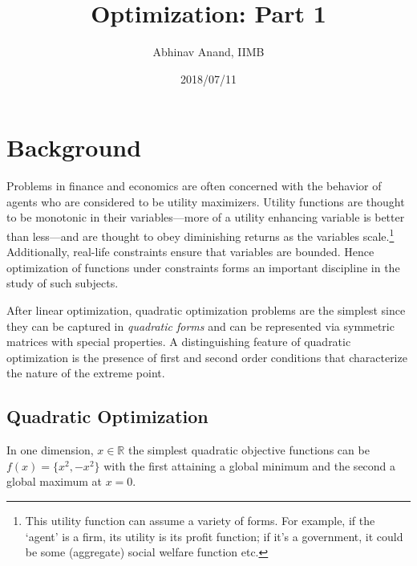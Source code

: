 \documentclass[11pt,]{article}
\title{Optimization: Part 1}
\author{Abhinav Anand, IIMB}
\date{2018/07/11}
\let\rmarkdownfootnote\footnote%
\def\footnote{\protect\rmarkdownfootnote}
\begin{document}
\maketitle

\section{Background}\label{background}

Problems in finance and economics are often concerned with the behavior
of agents who are considered to be utility maximizers. Utility functions
are thought to be monotonic in their variables---more of a utility
enhancing variable is better than less---and are thought to obey
diminishing returns as the variables scale.\footnote{This utility
  function can assume a variety of forms. For example, if the `agent' is
  a firm, its utility is its profit function; if it's a government, it
  could be some (aggregate) social welfare function etc.} Additionally,
real-life constraints ensure that variables are bounded. Hence
optimization of functions under constraints forms an important
discipline in the study of such subjects.

After linear optimization, quadratic optimization problems are the
simplest since they can be captured in \emph{quadratic forms} and can be
represented via symmetric matrices with special properties. A
distinguishing feature of quadratic optimization is the presence of
first and second order conditions that characterize the nature of the
extreme point.

\subsection{Quadratic Optimization}\label{quadratic-optimization}

In one dimension, \(x\in \mathbb{R}\) the simplest quadratic objective
functions can be \(f(x)=\{x^2, -x^2\}\) with the first attaining a
global minimum and the second a global maximum at \(x=0\).
\end{document}

